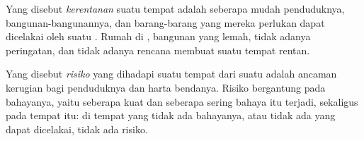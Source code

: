 \begin{definition}[Kerentanan]\label{def:g9:natural-risks:vulnerability}
Yang disebut \emph{kerentanan} suatu tempat adalah
seberapa mudah penduduknya, bangunan-bangunannya, dan barang-barang yang
mereka perlukan dapat dicelakai oleh suatu . Rumah di , bangunan yang lemah, tidak adanya peringatan, dan tidak adanya
rencana membuat suatu tempat rentan.
\end{definition}

\begin{definition}[Risiko]\label{def:g9:natural-risks:risk}
Yang disebut \emph{risiko} yang dihadapi suatu tempat dari
suatu  adalah ancaman kerugian bagi penduduknya dan harta
bendanya. Risiko bergantung pada bahayanya, yaitu seberapa kuat dan
seberapa sering bahaya itu terjadi, sekaligus pada  tempat itu:
di tempat yang tidak ada bahayanya, atau tidak ada yang dapat dicelakai,
tidak ada risiko.
\end{definition}

